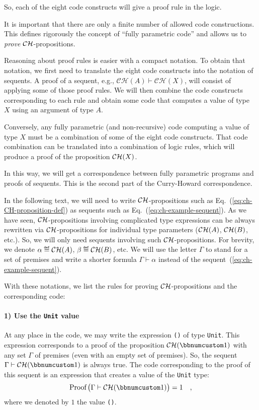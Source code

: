 So, each of the eight code constructs will give a proof rule in the
logic.

It is important that there are only a finite number of allowed code
constructions. This defines rigorously the concept of \textsf{``}fully parametric
code\textsf{''} and allows us to \emph{prove}
${\cal CH}$-propositions.

Reasoning about proof rules is easier with a compact notation. To
obtain that notation, we first need to translate the eight code constructs
into the notation of sequents. A proof of a sequent, e.g., $\mathcal{CH}(A)\vdash\mathcal{CH}(X)$,
will consist of applying some of those proof rules. We will then combine
the code constructs corresponding to each rule and obtain some code
that computes a value of type $X$ using an argument of type $A$. 

Conversely, any fully parametric (and non-recursive) code computing
a value of type $X$ must be a combination of some of the eight code
constructs. That code combination
can be translated into a combination of logic rules, which will produce
a proof of the proposition ${\cal CH}(X)$.

In this way, we will get a correspondence between fully parametric
programs and proofs of sequents. This is the second part of the Curry-Howard
correspondence.

In the following text, we will need to write ${\cal CH}$-propositions
such as Eq.~(\ref{eq:ch-CH-proposition-def}) as sequents such as
Eq.~(\ref{eq:ch-example-sequent}). As we have seen, ${\cal CH}$-propositions
involving complicated type expressions can be always rewritten via
${\cal CH}$-propositions for individual type parameters (${\cal CH}(A)$,
${\cal CH}(B)$, etc.). So, we will only need sequents involving such
${\cal CH}$-propositions. For brevity, we denote $\alpha\triangleq{\cal CH}(A)$,
$\beta\triangleq{\cal CH}(B)$, etc. We will use the letter $\Gamma$
to stand for a set of premises and write a shorter formula $\Gamma\vdash\alpha$
instead of the sequent~(\ref{eq:ch-example-sequent}).

With these notations, we list the rules for proving ${\cal CH}$-propositions
and the corresponding code:

\paragraph{1) Use the \texttt{Unit} value}

At any place in the code, we may write the expression \lstinline!()!
of type \lstinline!Unit!. This expression corresponds to a proof
of the proposition ${\cal CH}(\bbnum 1)$ with any set $\Gamma$ of
premises (even with an empty set of premises). So, the sequent $\Gamma\vdash{\cal CH}(\bbnum 1)$
is always true. The code corresponding to the proof of this sequent
is an expression that creates a value of the \lstinline!Unit! type:
\[
\text{Proof}\,\big(\Gamma\vdash{\cal CH}(\bbnum 1)\big)=1\quad,
\]
where we denoted by $1$ the value \lstinline!()!.

